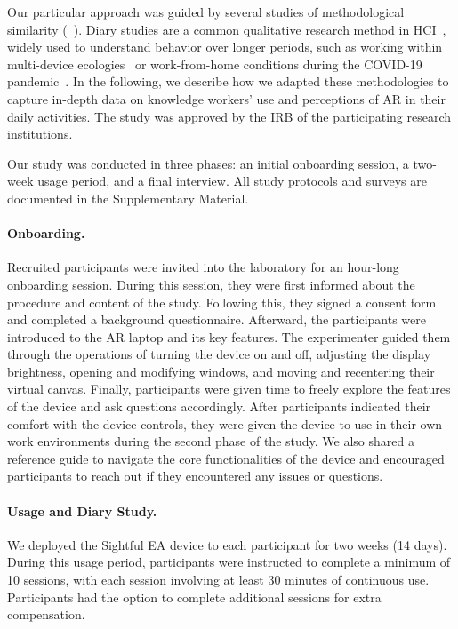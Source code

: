 Our particular approach was guided by several studies of methodological similarity (\eg~\cite{czerwinski2004diary,borghouts2022diary,jokela2015diary}).
Diary studies are a common qualitative research method in HCI~\cite{consolvo2017diary}, widely used to understand behavior over longer periods, such as working within multi-device ecologies~\cite{jokela2015diary} or work-from-home conditions during the COVID-19 pandemic~\cite{borghouts2022diary}.
In the following, we describe how we adapted these methodologies to capture in-depth data on knowledge workers' use and perceptions of AR in their daily activities.
The study was approved by the IRB of the participating research institutions.

Our study was conducted in three phases: an initial onboarding session, a two-week usage period, and a final interview.
All study protocols and surveys are documented in the Supplementary Material. 

\paragraph{Onboarding.}
Recruited participants were invited into the laboratory for an hour-long onboarding session. 
During this session, they were first informed about the procedure and content of the study. 
Following this, they signed a consent form and completed a background questionnaire. 
Afterward, the participants were introduced to the AR laptop and its key features. 
The experimenter guided them through the operations of turning the device on and off, adjusting the display brightness, opening and modifying windows, and moving and recentering their virtual canvas.
Finally, participants were given time to freely explore the features of the device and ask questions accordingly.
After participants indicated their comfort with the device controls, they were given the device to use in their own work environments during the second phase of the study. 
We also shared a reference guide to navigate the core functionalities of the device and encouraged participants to reach out if they encountered any issues or questions.

\paragraph{Usage and Diary Study.} 
We deployed the Sightful EA device to each participant for two weeks (14 days). During this usage period, participants were instructed to complete a minimum of 10 sessions, with each session involving at least 30 minutes of continuous use.
Participants had the option to complete additional sessions for extra compensation.

